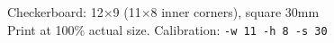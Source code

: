 \documentclass{article}
\begin{document}
\begin{center}

\vspace{2mm}
{\large Checkerboard: 12$\times$9 (11$\times$8 inner corners), square 30mm}\\[1mm]
{\small Print at 100\% actual size. Calibration: \texttt{-w 11 -h 8 -s 30}}
\end{center}
\end{document}
